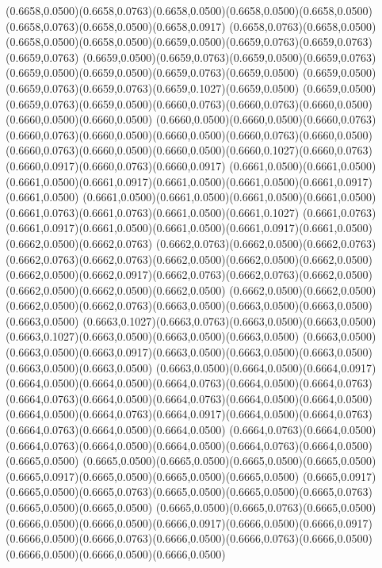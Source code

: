 (0.6658,0.0500)(0.6658,0.0763)(0.6658,0.0500)(0.6658,0.0500)(0.6658,0.0500)(0.6658,0.0763)(0.6658,0.0500)(0.6658,0.0917)
(0.6658,0.0763)(0.6658,0.0500)(0.6658,0.0500)(0.6658,0.0500)(0.6659,0.0500)(0.6659,0.0763)(0.6659,0.0763)(0.6659,0.0763)
(0.6659,0.0500)(0.6659,0.0763)(0.6659,0.0500)(0.6659,0.0763)(0.6659,0.0500)(0.6659,0.0500)(0.6659,0.0763)(0.6659,0.0500)
(0.6659,0.0500)(0.6659,0.0763)(0.6659,0.0763)(0.6659,0.1027)(0.6659,0.0500)
\PST@Solid(0.6659,0.0500)(0.6659,0.0763)(0.6659,0.0500)(0.6660,0.0763)(0.6660,0.0763)(0.6660,0.0500)(0.6660,0.0500)(0.6660,0.0500)
(0.6660,0.0500)(0.6660,0.0500)(0.6660,0.0763)(0.6660,0.0763)(0.6660,0.0500)(0.6660,0.0500)(0.6660,0.0763)(0.6660,0.0500)
(0.6660,0.0763)(0.6660,0.0500)(0.6660,0.0500)(0.6660,0.1027)(0.6660,0.0763)(0.6660,0.0917)(0.6660,0.0763)(0.6660,0.0917)
(0.6661,0.0500)(0.6661,0.0500)(0.6661,0.0500)(0.6661,0.0917)(0.6661,0.0500)(0.6661,0.0500)(0.6661,0.0917)(0.6661,0.0500)
(0.6661,0.0500)(0.6661,0.0500)(0.6661,0.0500)(0.6661,0.0500)(0.6661,0.0763)(0.6661,0.0763)(0.6661,0.0500)(0.6661,0.1027)
(0.6661,0.0763)(0.6661,0.0917)(0.6661,0.0500)(0.6661,0.0500)(0.6661,0.0917)(0.6661,0.0500)(0.6662,0.0500)(0.6662,0.0763)
(0.6662,0.0763)(0.6662,0.0500)(0.6662,0.0763)(0.6662,0.0763)(0.6662,0.0763)(0.6662,0.0500)(0.6662,0.0500)(0.6662,0.0500)
(0.6662,0.0500)(0.6662,0.0917)(0.6662,0.0763)(0.6662,0.0763)(0.6662,0.0500)(0.6662,0.0500)(0.6662,0.0500)(0.6662,0.0500)
(0.6662,0.0500)(0.6662,0.0500)(0.6662,0.0500)(0.6662,0.0763)(0.6663,0.0500)(0.6663,0.0500)(0.6663,0.0500)(0.6663,0.0500)
(0.6663,0.1027)(0.6663,0.0763)(0.6663,0.0500)(0.6663,0.0500)(0.6663,0.1027)(0.6663,0.0500)(0.6663,0.0500)(0.6663,0.0500)
(0.6663,0.0500)(0.6663,0.0500)(0.6663,0.0917)(0.6663,0.0500)(0.6663,0.0500)(0.6663,0.0500)(0.6663,0.0500)(0.6663,0.0500)
(0.6663,0.0500)(0.6664,0.0500)(0.6664,0.0917)(0.6664,0.0500)(0.6664,0.0500)(0.6664,0.0763)(0.6664,0.0500)(0.6664,0.0763)
(0.6664,0.0763)(0.6664,0.0500)(0.6664,0.0763)(0.6664,0.0500)(0.6664,0.0500)
\PST@Solid(0.6664,0.0500)(0.6664,0.0763)(0.6664,0.0917)(0.6664,0.0500)(0.6664,0.0763)(0.6664,0.0763)(0.6664,0.0500)(0.6664,0.0500)
(0.6664,0.0763)(0.6664,0.0500)(0.6664,0.0763)(0.6664,0.0500)(0.6664,0.0500)(0.6664,0.0763)(0.6664,0.0500)(0.6665,0.0500)
(0.6665,0.0500)(0.6665,0.0500)(0.6665,0.0500)(0.6665,0.0500)(0.6665,0.0917)(0.6665,0.0500)(0.6665,0.0500)(0.6665,0.0500)
(0.6665,0.0917)(0.6665,0.0500)(0.6665,0.0763)(0.6665,0.0500)(0.6665,0.0500)(0.6665,0.0763)(0.6665,0.0500)(0.6665,0.0500)
(0.6665,0.0500)(0.6665,0.0763)(0.6665,0.0500)(0.6666,0.0500)(0.6666,0.0500)(0.6666,0.0917)(0.6666,0.0500)(0.6666,0.0917)
(0.6666,0.0500)(0.6666,0.0763)(0.6666,0.0500)(0.6666,0.0763)(0.6666,0.0500)(0.6666,0.0500)(0.6666,0.0500)(0.6666,0.0500)

